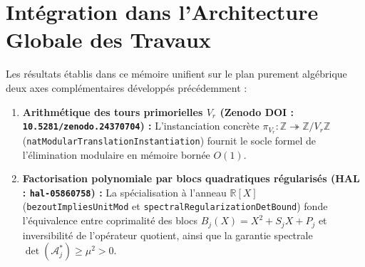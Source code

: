 \documentclass[11pt,a4paper]{article}
\begin{document}
\section{Intégration dans l'Architecture Globale des Travaux}
Les résultats établis dans ce mémoire unifient sur le plan purement algébrique deux axes complémentaires développés précédemment :
\begin{enumerate}
    \item \textbf{Arithmétique des tours primorielles $V_r$ (Zenodo DOI : \texttt{10.5281/zenodo.24370704}) :} L'instanciation concrète $\pi_{V_r} : \mathbb{Z} \twoheadrightarrow \mathbb{Z}/V_r\mathbb{Z}$ (\texttt{natModularTranslationInstantiation}) fournit le socle formel de l'élimination modulaire en mémoire bornée $O(1)$.
    \item \textbf{Factorisation polynomiale par blocs quadratiques régularisés (HAL : \texttt{hal-05860758}) :} La spécialisation à l'anneau $\mathbb{R}[X]$ (\texttt{bezoutImpliesUnitMod} et \texttt{spectralRegularizationDetBound}) fonde l'équivalence entre coprimalité des blocs $B_j(X) = X^2 + S_j X + P_j$ et inversibilité de l'opérateur quotient, ainsi que la garantie spectrale $\det(\mathcal{A}_j^*) \ge \mu^2 > 0$.
\end{enumerate}
\end{document}
